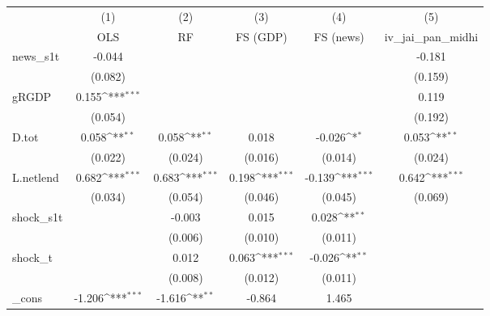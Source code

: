 {
\def\sym#1{\ifmmode^{#1}\else\(^{#1}\)\fi}
\begin{tabular}{l*{5}{c}}
\toprule
            &\multicolumn{1}{c}{(1)}&\multicolumn{1}{c}{(2)}&\multicolumn{1}{c}{(3)}&\multicolumn{1}{c}{(4)}&\multicolumn{1}{c}{(5)}\\
            &\multicolumn{1}{c}{OLS}&\multicolumn{1}{c}{RF}&\multicolumn{1}{c}{FS (GDP)}&\multicolumn{1}{c}{FS (news)}&\multicolumn{1}{c}{iv\_jai\_pan\_midhi}\\
\midrule
news\_s1t    &      -0.044         &                     &                     &                     &      -0.181         \\
            &     (0.082)         &                     &                     &                     &     (0.159)         \\
\addlinespace
gRGDP       &       0.155\sym{***}&                     &                     &                     &       0.119         \\
            &     (0.054)         &                     &                     &                     &     (0.192)         \\
\addlinespace
D.tot       &       0.058\sym{**} &       0.058\sym{**} &       0.018         &      -0.026\sym{*}  &       0.053\sym{**} \\
            &     (0.022)         &     (0.024)         &     (0.016)         &     (0.014)         &     (0.024)         \\
\addlinespace
L.netlend   &       0.682\sym{***}&       0.683\sym{***}&       0.198\sym{***}&      -0.139\sym{***}&       0.642\sym{***}\\
            &     (0.034)         &     (0.054)         &     (0.046)         &     (0.045)         &     (0.069)         \\
\addlinespace
shock\_s1t   &                     &      -0.003         &       0.015         &       0.028\sym{**} &                     \\
            &                     &     (0.006)         &     (0.010)         &     (0.011)         &                     \\
\addlinespace
shock\_t     &                     &       0.012         &       0.063\sym{***}&      -0.026\sym{**} &                     \\
            &                     &     (0.008)         &     (0.012)         &     (0.011)         &                     \\
\addlinespace
\_cons      &      -1.206\sym{***}&      -1.616\sym{**} &      -0.864         &       1.465         &                     \\

\end{tabular}}
